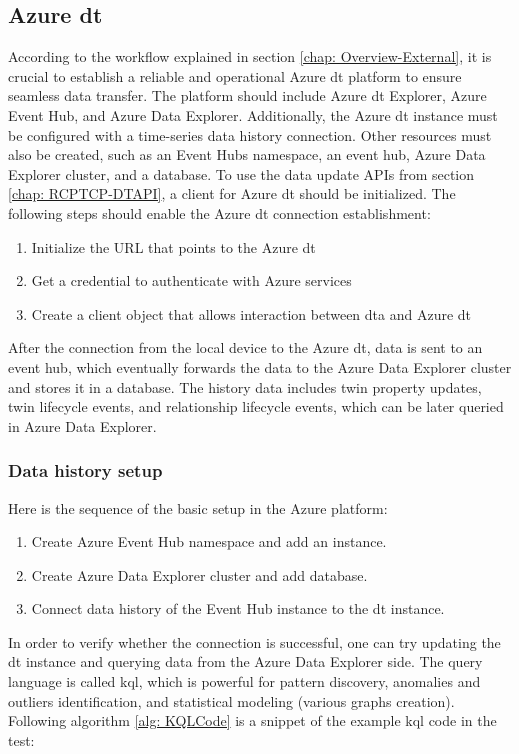 \subsection{Azure \gls{dt}}
According to the workflow explained in section \ref{chap: Overview-External}, 
it is crucial to establish a reliable and operational Azure \gls{dt} platform 
to ensure seamless data transfer. The platform should include Azure \gls{dt} Explorer, 
Azure Event Hub, and Azure Data Explorer. Additionally, the Azure \gls{dt} 
instance must be configured with a time-series data history connection. Other resources 
must also be created, such as an Event Hubs namespace, an event hub, Azure Data Explorer 
cluster, and a database. To use the data update APIs 
from section \ref{chap: RCPTCP-DTAPI}, a client for Azure \gls{dt} should be 
initialized. The following steps should enable the Azure \gls{dt} connection 
establishment: 


\begin{enumerate}
    \item Initialize the URL that points to the Azure \gls{dt}
    \item Get a credential to authenticate with Azure services
    \item Create a client object that allows interaction between \gls{dta} and Azure \gls{dt}
    \end{enumerate}

After the connection from the local device to the Azure \gls{dt}, 
data is sent to an event hub, which eventually forwards the data to 
the Azure Data Explorer cluster and stores it in a database. The history data includes 
twin property updates, twin lifecycle events, and relationship lifecycle events, which 
can be later queried in Azure Data Explorer.

\subsubsection{Data history setup}
Here is the sequence of the basic setup in the Azure platform:
\begin{enumerate}
    \item Create Azure Event Hub namespace and add an instance.
    \item Create Azure Data Explorer cluster and add database.
    \item Connect data history of the Event Hub instance to the \gls{dt} instance.
\end{enumerate}

In order to verify whether the connection is successful, one can try updating the 
\gls{dt} instance and querying data from the Azure Data Explorer side. The query
language is called \gls{kql}, which is powerful for pattern discovery, anomalies 
and outliers identification, and statistical modeling (various graphs creation). 
Following algorithm \ref{alg: KQLCode} is a snippet of the example \gls{kql} code in the test: 

